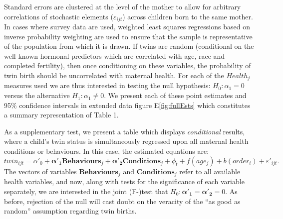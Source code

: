 \documentclass{nature}
\begin{document}
\begin{linenumbers}
Standard errors are clustered at the level of the mother to allow for arbitrary correlations of stochastic elements ($\varepsilon_{ijt}$) across children born to the same mother. In cases where survey data are used, weighted least squares regressions based on inverse probability weighting are used to ensure that the sample is representative of the population from which it is drawn. If twins are random (conditional on the well known  hormonal predictors which are correlated with age, race and completed fertility\cite{Hall2003}), then once conditioning on these variables, the probability of twin birth should be uncorrelated with maternal health. For each of the $Health_j$ measures used we are thus interested in testing the null hypothesis: $H_0: \alpha_1=0$ versus the alternative $H_1: \alpha_1\neq0$.  We present each of these point estimates and 95\% confidence intervals in extended data figure E\ref{fig:fullEsts} which constitutes a summary representation of Table 1. %

As a supplementary test, we present a table which displays \emph{conditional} results, where a child's twin status is simultaneously regressed upon all maternal health conditions or behaviours.  In this case, the estimated equations are:
\begin{equation}
  \label{reg:twincond}
  twin_{ijt}=\alpha'_0 + \bm{\alpha'_1} \bm{Behaviours}_j + \bm{\alpha'_2} \bm{Conditions}_j + \phi_t + f(age_j) + b(order_i) + \varepsilon'_{ijt}.
\end{equation}
The vectors of variables $\bm{Behaviours}_j$ and $\bm{Conditions}_j$ refer to all available health variables, and now, along with tests for the significance of each variable separately, we are interested in the joint (F-)test that $H_0:\bm{\alpha'_1}=\bm{\alpha'_2}=0$.  As before, rejection of the null will cast doubt on the veracity of the ``as good as random'' assumption regarding twin births.



\end{linenumbers}
\end{document}
